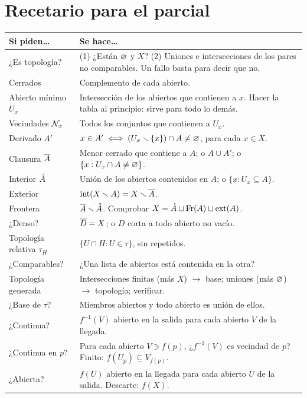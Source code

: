 \section{Recetario para el parcial}\label{sec:recetario}
\begin{center}\small\renewcommand{\arraystretch}{1.35}
\begin{longtable}{@{}p{4.3cm}p{11.1cm}@{}}\toprule
\textbf{Si piden\dots} & \textbf{Se hace\dots}\\ \midrule\endhead
¿Es topología? & (1) ¿Están $\varnothing$ y $X$? (2) Uniones e intersecciones de los pares no comparables. Un fallo basta
para decir que no.\\
Cerrados & Complemento de cada abierto.\\
Abierto mínimo $U_x$ & Intersección de los abiertos que contienen a $x$. Hacer la tabla al principio: sirve para todo
lo demás.\\
Vecindades $\mathcal{N}_x$ & Todos los conjuntos que contienen a $U_x$.\\
Derivado $A'$ & $x\in A'\iff(U_x\smallsetminus\{x\})\cap A\neq\varnothing$, para cada $x\in X$.\\
Clausura $\overline{A}$ & Menor cerrado que contiene a $A$; o $A\cup A'$; o $\{x:U_x\cap A\neq\varnothing\}$.\\
Interior $\mathring{A}$ & Unión de los abiertos contenidos en $A$; o $\{x:U_x\subseteq A\}$.\\
Exterior & $\operatorname{int}(X\smallsetminus A)=X\smallsetminus\overline{A}$.\\
Frontera & $\overline{A}\smallsetminus\mathring{A}$. Comprobar $X=\mathring{A}\sqcup\operatorname{Fr}(A)\sqcup\operatorname{ext}(A)$.\\
¿Denso? & $\overline{D}=X$; o $D$ corta a todo abierto no vacío.\\
Topología relativa $\tau_H$ & $\{U\cap H:U\in\tau\}$, sin repetidos.\\
¿Comparables? & ¿Una lista de abiertos está contenida en la otra?\\
Topología generada & Intersecciones finitas (más $X$) $\to$ base; uniones (más $\varnothing$) $\to$ topología; verificar.\\
¿Base de $\tau$? & Miembros abiertos y todo abierto es unión de ellos.\\
¿Continua? & $f^{-1}(V)$ abierto en la salida para cada abierto $V$ de la llegada.\\
¿Continua en $p$? & Para cada abierto $V\ni f(p)$, ¿$f^{-1}(V)$ es vecindad de $p$? Finito: $f(U_p)\subseteq V_{f(p)}$.\\
¿Abierta? & $f(U)$ abierto en la llegada para cada abierto $U$ de la salida. Descarte: $f(X)$.\\

\end{longtable}
\end{center}
